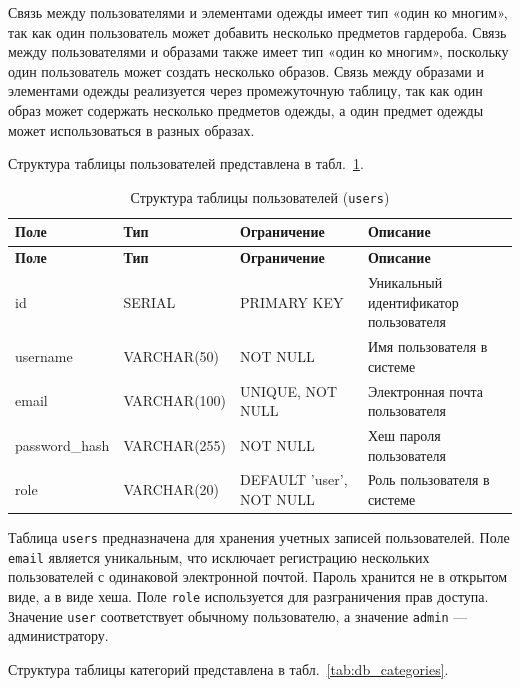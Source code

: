 Связь между пользователями и элементами одежды имеет тип «один ко многим», так как один пользователь может добавить несколько предметов гардероба. Связь между пользователями и образами также имеет тип «один ко многим», поскольку один пользователь может создать несколько образов. Связь между образами и элементами одежды реализуется через промежуточную таблицу, так как один образ может содержать несколько предметов одежды, а один предмет одежды может использоваться в разных образах.

Структура таблицы пользователей представлена в табл.~\ref{tab:db_users}.

\begin{longtable}{|l|l|p{3.5cm}|p{5.5cm}|}
	\caption{Структура таблицы пользователей (\texttt{users})}
	\label{tab:db_users} \\

	\hline
	\textbf{Поле} & \textbf{Тип} & \textbf{Ограничение} & \textbf{Описание} \\ \hline
	\endfirsthead

	\tabcont{\ref{tab:db_users}}
	\textbf{Поле} & \textbf{Тип} & \textbf{Ограничение} & \textbf{Описание} \\ \hline
	\endhead

	\hline
	\endfoot

	\hline
	\endlastfoot

	id & SERIAL & PRIMARY KEY & Уникальный идентификатор пользователя \\ \hline
	username & VARCHAR(50) & NOT NULL & Имя пользователя в системе \\ \hline
	email & VARCHAR(100) & UNIQUE, NOT NULL & Электронная почта пользователя \\ \hline
	password\_hash & VARCHAR(255) & NOT NULL & Хеш пароля пользователя \\ \hline
	role & VARCHAR(20) & DEFAULT 'user', NOT NULL & Роль пользователя в системе \\ \hline
\end{longtable}

Таблица \texttt{users} предназначена для хранения учетных записей пользователей. Поле \texttt{email} является уникальным, что исключает регистрацию нескольких пользователей с одинаковой электронной почтой. Пароль хранится не в открытом виде, а в виде хеша. Поле \texttt{role} используется для разграничения прав доступа. Значение \texttt{user} соответствует обычному пользователю, а значение \texttt{admin} --- администратору.

Структура таблицы категорий представлена в табл.~\ref{tab:db_categories}.

